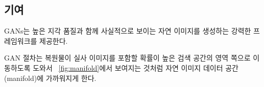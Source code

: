 \documentclass[10pt,twocolumn,letterpaper]{article}
\newcommand{\kor}[1]{#1}
\newcommand{\eng}[1]{}
\newcommand{\summary}[1]{}
\begin{document}
\subsection{\eng{Contribution}\kor{기여}}
\eng{
\acp{GAN} provide a powerful framework for generating plausible-looking natural images with high perceptual quality.
}\kor{
\acp{GAN}는 높은 지각 품질과 함께 사실적으로 보이는 자연 이미지를 생성하는 강력한 프레임워크를 제공한다.
}
\eng{
The \ac{GAN} procedure encourages the reconstructions to move towards regions of the search space with high probability of containing photo-realistic images and thus closer to the natural image manifold as shown in \figurename~\ref{fig:manifold}.
}\kor{
GAN 절차는 복원물이 실사 이미지를 포함할 확률이 높은 검색 공간의 영역 쪽으로 이동하도록 도와서 \figurename~\ref{fig:manifold}에서 보여지는 것처럼 자연 이미지 데이터 공간(manifold)에 가까워지게 한다.
}

\summary{
실사 이미지 생성을 위한 강력한 프레임워크인 GAN
}
\end{document}
